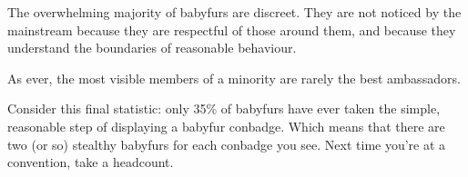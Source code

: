 The overwhelming majority of babyfurs are discreet. They are not noticed by the mainstream because they are respectful of those around them, and because they understand the boundaries of reasonable behaviour.

As ever, the most visible members of a minority are rarely the best ambassadors.

Consider this final statistic: only 35\% of babyfurs have ever taken the simple, reasonable step of displaying a babyfur conbadge. Which means that there are two (or so) stealthy babyfurs for each conbadge you see. Next time you're at a convention, take a headcount.

